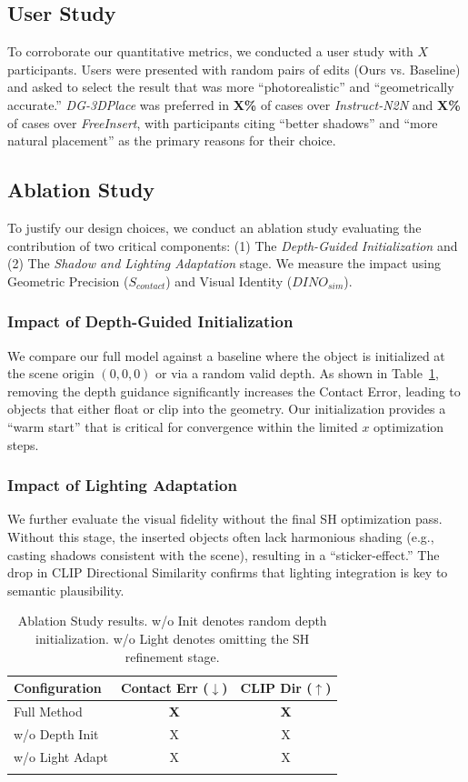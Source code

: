 \documentclass[pdflatex,sn-mathphys-num]{sn-jnl}%
\theoremstyle{thmstyleone}%
\theoremstyle{thmstyletwo}%
\theoremstyle{thmstylethree}%
\begin{document}
\subsection{User Study}
To corroborate our quantitative metrics, we conducted a user study with $X$ participants. Users were presented with random pairs of edits (Ours vs. Baseline) and asked to select the result that was more ``photorealistic'' and ``geometrically accurate.''
\textit{DG-3DPlace} was preferred in \textbf{X\%} of cases over \textit{Instruct-N2N} and \textbf{X\%} of cases over \textit{FreeInsert}, with participants citing ``better shadows'' and ``more natural placement'' as the primary reasons for their choice.

\subsection{Ablation Study}\label{subsec:ablation}
To justify our design choices, we conduct an ablation study evaluating the contribution of two critical components: (1) The \textit{Depth-Guided Initialization} and (2) The \textit{Shadow and Lighting Adaptation} stage. We measure the impact using Geometric Precision ($S_{contact}$) and Visual Identity ($DINO_{sim}$).

\subsubsection{Impact of Depth-Guided Initialization}
We compare our full model against a baseline where the object is initialized at the scene origin $(0,0,0)$ or via a random valid depth. As shown in Table~\ref{tab:ablation}, removing the depth guidance significantly increases the Contact Error, leading to objects that either float or clip into the geometry. Our initialization provides a ``warm start'' that is critical for convergence within the limited $x$ optimization steps.

\subsubsection{Impact of Lighting Adaptation}
We further evaluate the visual fidelity without the final SH optimization pass. Without this stage, the inserted objects often lack harmonious shading (e.g., casting shadows consistent with the scene), resulting in a ``sticker-effect.'' The drop in CLIP Directional Similarity confirms that lighting integration is key to semantic plausibility.

\begin{table}[h]
\caption{Ablation Study results. w/o Init denotes random depth initialization. w/o Light denotes omitting the SH refinement stage.}\label{tab:ablation}
\begin{tabular}{@{}lcc@{}}
\toprule
Configuration & Contact Err ($\downarrow$) & CLIP Dir ($\uparrow$) \\
\midrule
Full Method & \textbf{X} & \textbf{X} \\
w/o Depth Init & X & X \\
w/o Light Adapt & X & X \\
\botrule
\end{tabular}
\end{table}
\end{document}
